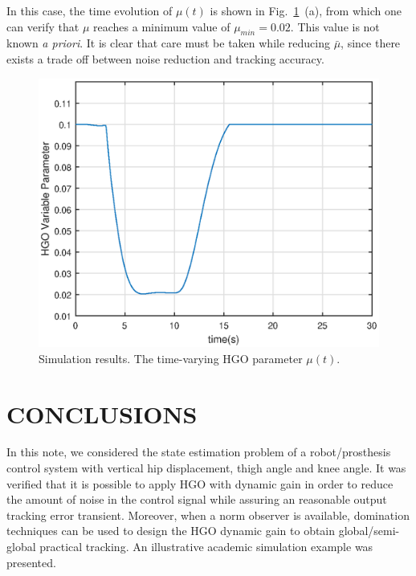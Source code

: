 \documentclass[letterpaper, 10 pt, conference]{ieeeconf}  %
\theoremstyle{plain}
\theoremstyle{definition}
\theoremstyle{remark}
\begin{document}
%
In this case, the time
evolution of $\mu(t)$ is shown in Fig.~\ref{fig:timevarying4}~(a), from which one can verify
that $\mu$ reaches a minimum value of $\mu_{min}=0.02$. 
This value is not known {\em a priori}. It is clear that care must be taken while reducing $\bar{\mu}$, since there exists a trade off
between noise reduction and tracking accuracy.
%
%
\begin{figure}[h!]
\begin{center}
\includegraphics[width = 13cm]{Figs/mu.eps}
\caption{Simulation results. The time-varying HGO parameter $\mu(t)$.}
\label{fig:timevarying4}
\end{center}
\end{figure}
%




\section{CONCLUSIONS}


In this note, we considered the state estimation problem of a robot/prosthesis control system with vertical hip displacement, thigh angle and knee angle.  It was verified that it is possible to apply HGO with dynamic gain in order to reduce the amount of noise in the control signal while assuring an reasonable output tracking error transient. Moreover, when a norm observer is available, domination techniques can be used to design the HGO dynamic gain to obtain global/semi-global practical tracking. An illustrative academic simulation example was presented.
\end{document}
